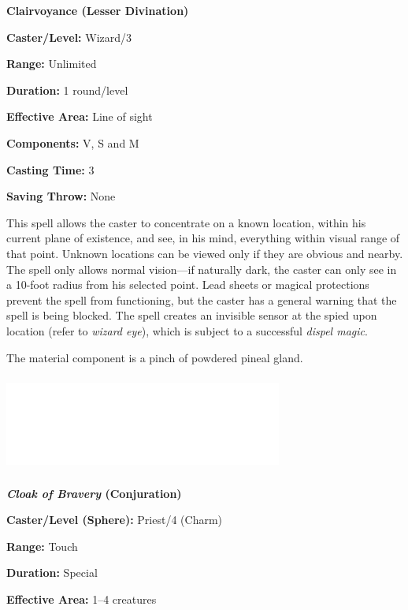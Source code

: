 \begin{multicols}{2}
\begin{minipage}{\columnwidth}
\noindent \textbf{Clairvoyance (Lesser Divination)}

\noindent \textbf{Caster/Level:} Wizard/3

\noindent \textbf{Range:} Unlimited

\noindent \textbf{Duration:} 1 round/level

\noindent \textbf{Effective Area:} Line of sight

\noindent \textbf{Components:} V, S and M

\noindent \textbf{Casting Time:} 3

\noindent \textbf{Saving Throw:} None

\end{minipage}

This spell allows the caster to concentrate on a known location, within his current plane of existence, and see, in his mind, everything within visual range of that point.  Unknown locations can be viewed only if they are obvious and nearby.  The spell only allows normal vision---if naturally dark, the caster can only see in a 10-foot radius from his selected point.  Lead sheets or magical protections prevent the spell from functioning, but the caster has a general warning that the spell is being blocked.  The spell creates an invisible sensor at the spied upon location (refer to \textit{wizard eye}), which is subject to a successful \textit{dispel magic}.

The material component is a pinch of powdered pineal gland.

\noindent\includegraphics[width=3.6in, height=1.25in]{testblock.pdf}

\vspace{1em}

\noindent
\begin{minipage}{\columnwidth}

\noindent \textbf{\textit{Cloak of Bravery} (Conjuration)}

\noindent \textbf{Caster/Level (Sphere):} Priest/4 (Charm)

\noindent \textbf{Range:} Touch

\noindent \textbf{Duration:} Special

\noindent \textbf{Effective Area:} 1--4 creatures


\end{minipage}
\end{multicols}
